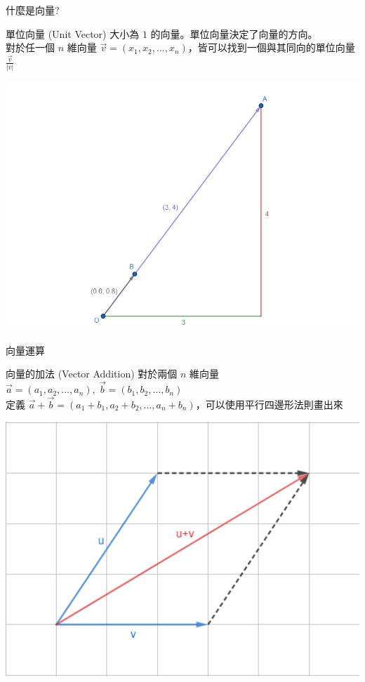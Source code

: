 \documentclass[aspectratio=169]{beamer}
\begin{document}
\begin{frame}{什麼是向量?}
    \begin{alertblock}{單位向量 (Unit Vector)}
        大小為 $1$ 的向量。單位向量決定了向量的方向。\\
        \vspace{5mm}
        對於任一個 $n$ 維向量 $\vec v = (x_1,x_2,\dots,x_n)$，皆可以找到一個與其同向的單位向量 $\frac{\vec v}{|v|}$
    \end{alertblock}
    \begin{center}
        \includegraphics[scale=0.25]{images/unit vector.png}
    \end{center}
\end{frame}

\begin{frame}{向量運算}
    \begin{alertblock}{向量的加法 (Vector Addition)}
        對於兩個 $n$ 維向量 $\vec a = (a_1,a_2,\dots,a_n), \ \vec b = (b_1,b_2, \dots, b_n)$ \\
        \vspace{2.5mm}
        定義 $\vec a + \vec b = (a_1+b_1,a_2+b_2,\dots,a_n+b_n)$，可以使用平行四邊形法則畫出來
    \end{alertblock}
    \begin{center}
        \includegraphics[scale=0.45]{images/vector_addition.png}
    \end{center}
\end{frame}
\end{document}
